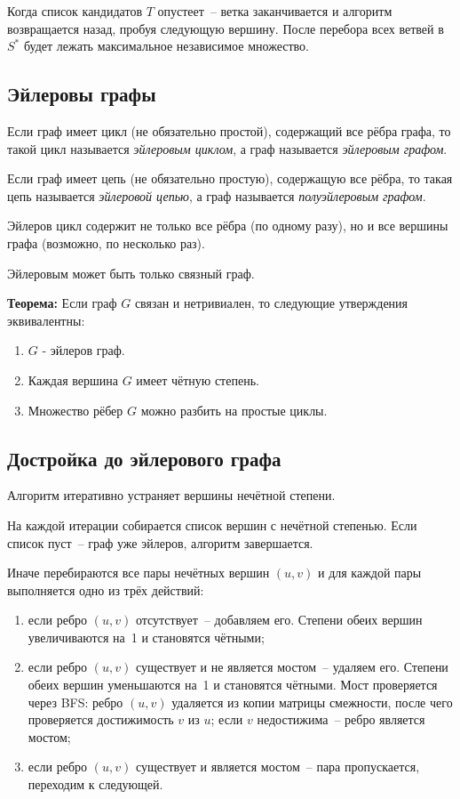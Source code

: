 Когда список кандидатов $T$ опустеет~-- ветка заканчивается
и алгоритм возвращается назад, пробуя следующую вершину.
После перебора всех ветвей в $S^*$ будет лежать максимальное
независимое множество.

\subsection{Эйлеровы графы}

Если граф имеет цикл (не обязательно простой), содержащий все рёбра графа,
то такой цикл называется \textit{эйлеровым циклом}, а граф называется
\textit{эйлеровым графом}.

Если граф имеет цепь (не обязательно простую), содержащую все рёбра,
то такая цепь называется \textit{эйлеровой цепью}, а граф называется
\textit{полуэйлеровым графом}.

Эйлеров цикл содержит не только все рёбра (по одному разу),
но и все вершины графа (возможно, по несколько раз).

Эйлеровым может быть только связный граф.


\textbf{Теорема:} Если граф $G$ связан и нетривиален, то следующие утверждения эквивалентны:
\begin{enumerate}
    \item $G$ - эйлеров граф.
    \item Каждая вершина $G$ имеет чётную степень.
    \item Множество рёбер $G$ можно разбить на простые циклы.
\end{enumerate}

\subsection{Достройка до эйлерового графа}

Алгоритм итеративно устраняет вершины нечётной степени.

На каждой итерации собирается список вершин с нечётной степенью.
Если список пуст~-- граф уже эйлеров, алгоритм завершается.

Иначе перебираются все пары нечётных вершин $(u, v)$ и для каждой
пары выполняется одно из трёх действий:

\begin{enumerate}
    \item если ребро $(u, v)$ отсутствует~-- добавляем его.
    Степени обеих вершин увеличиваются на~1 и становятся чётными;

    \item если ребро $(u, v)$ существует и не является мостом~--
    удаляем его. Степени обеих вершин уменьшаются на~1
    и становятся чётными. Мост проверяется через BFS:
    ребро $(u,v)$ удаляется из копии матрицы смежности,
    после чего проверяется достижимость $v$ из $u$;
    если $v$ недостижима~-- ребро является мостом;

    \item если ребро $(u, v)$ существует и является мостом~--
    пара пропускается, переходим к следующей.
\end{enumerate}


